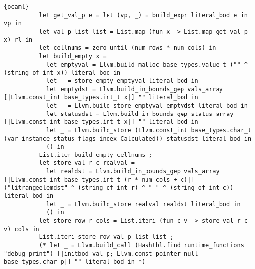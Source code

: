\begin{lstlisting}{ocaml}
          let get_val_p e = let (vp, _) = build_expr literal_bod e in vp in
          let val_p_list_list = List.map (fun x -> List.map get_val_p x) rl in
          let cellnums = zero_until (num_rows * num_cols) in
          let build_empty x =
            let emptyval = Llvm.build_malloc base_types.value_t ("" ^ (string_of_int x)) literal_bod in
            let _ = store_empty emptyval literal_bod in
            let emptydst = Llvm.build_in_bounds_gep vals_array [|Llvm.const_int base_types.int_t x|] "" literal_bod in
            let _ = Llvm.build_store emptyval emptydst literal_bod in
            let statusdst = Llvm.build_in_bounds_gep status_array [|Llvm.const_int base_types.int_t x|] "" literal_bod in
            let _ = Llvm.build_store (Llvm.const_int base_types.char_t (var_instance_status_flags_index Calculated)) statusdst literal_bod in
            () in
          List.iter build_empty cellnums ;
          let store_val r c realval =
            let realdst = Llvm.build_in_bounds_gep vals_array [|Llvm.const_int base_types.int_t (r * num_cols + c)|] ("litrangeelemdst" ^ (string_of_int r) ^ "_" ^ (string_of_int c)) literal_bod in
            let _ = Llvm.build_store realval realdst literal_bod in
            () in
          let store_row r cols = List.iteri (fun c v -> store_val r c v) cols in
          List.iteri store_row val_p_list_list ;
          (* let _ = Llvm.build_call (Hashtbl.find runtime_functions "debug_print") [|initbod_val_p; Llvm.const_pointer_null base_types.char_p|] "" literal_bod in *)


\end{lstlisting}
